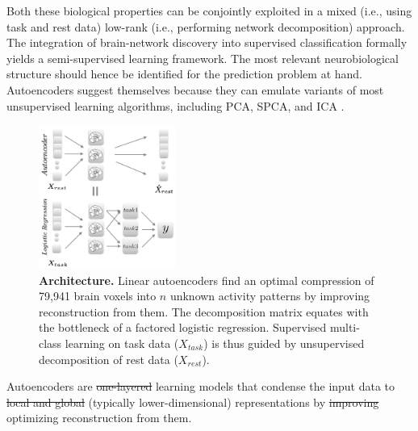 \documentclass{article} %
\newcommand{\suggestadd}[1]{{\color{blue} #1}}
\newcommand{\suggestremove}[1]{{\color{red} \sout{#1}}}
\begin{document}
Both these biological properties can be conjointly exploited in a mixed
 (i.e., using task and rest data)
low-rank (i.e., performing network decomposition)
approach.
%
The integration of brain-network discovery into
supervised classification formally yields a semi-supervised learning
framework. The most relevant
neurobiological structure should hence be identified
for the prediction problem at hand.
%
Autoencoders suggest themselves because they can emulate
variants of most unsupervised learning algorithms,
including PCA, SPCA, and ICA \cite{hinton06}.
\begin{figure}
  \centering
    \includegraphics[width=0.40\textwidth]{figures/figure1.png}
  \vspace{-0.7cm}
  \caption {\textbf{Architecture.}
  Linear autoencoders find an optimal compression of 79,941 brain voxels
  into $n$ unknown activity patterns by improving reconstruction from them.
  The decomposition matrix equates with the bottleneck of
  a factored logistic regression.
  Supervised multi-class learning on task data ($X_{task}$)
  is thus guided by
  unsupervised decomposition of rest data ($X_{rest}$).
  }
\end{figure}
%
Autoencoders
are \suggestremove{one-layered} learning models 
that condense the input data to
\suggestremove{local and global} \suggestadd{(typically lower-dimensional)} 
representations
by \suggestremove{improving} \suggestadd{optimizing}
reconstruction from them.
%
\end{document}
